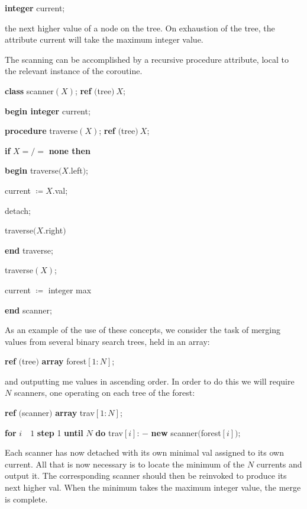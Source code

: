 \quad \textbf{integer} current;

\noindent
the next higher value of a node on the tree. On exhaustion of the tree, the attribute current will take the maximum integer value.

The scanning can be accomplished by a recursive procedure attribute, local to the relevant instance of the coroutine.

\quad \textbf{class} scanner$(X)$; \textbf{ref} $($tree$)\ X$;

\quad \quad \textbf{begin integer} current;

\quad \quad \quad \textbf{procedure} traverse$(X)$; \textbf{ref} $($tree$)\ X$;

\quad \quad \quad \quad \textbf{if} $X =/=$ \textbf{none then}

\quad \quad \quad \quad \quad \textbf{begin} traverse$(X$.left$)$;

\quad \quad \quad \quad \quad \quad current $\coloneq X$.val;

\quad \quad \quad \quad \quad \quad detach;

\quad \quad \quad \quad \quad \quad traverse$(X$.right$)$

\quad \quad \quad \quad \quad \textbf{end} traverse;

\quad \quad \quad traverse$(X)$;

\quad \quad \quad current $\coloneq$ integer max

\quad \quad \textbf{end} scanner;

As an example of the use of these concepts, we consider the task of merging values from several binary search trees, held in an array:

\quad \textbf{ref} $($tree$)$ \textbf{array} forest$[1: N]$;

\noindent
and outputting me values in ascending order. In order to do this we will require $N$ scanners, one operating on each tree of the forest:

\quad \textbf{ref} $($scanner$)$ \textbf{array} trav$[1: N]$;

\quad \textbf{for} $i\quad 1$ \textbf{step} 1 \textbf{until} $N$ \textbf{do} trav$[i]$: $-$ \textbf{new} scanner$($forest$[i]);$

Each scanner has now detached with its own minimal val assigned to its own current. All that is now necessary is to locate the minimum of the $N$ currents and output it. The corresponding scanner should then be reinvoked to produce its next higher val. When the minimum takes the maximum integer value, the merge is complete.

